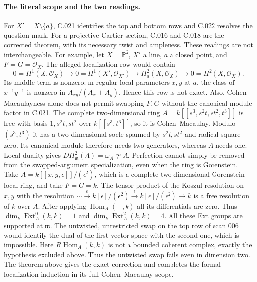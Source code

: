 \paragraph{The literal scope and the two readings.}
For $X'=X\setminus\{a\}$, C.021 identifies the top and bottom
rows and C.022 resolves the question mark. For a projective
Cartier section, C.016 and C.018 are the corrected theorem, with
its necessary twist and ampleness. These readings are not
interchangeable. For example, let $X=\mathbb P^2$, $X'$ a line,
$a$ a closed point, and $F=G=\mathcal O_X$. The alleged
localization row would contain
\[
 0=H^1(X,\mathcal O_X)\longrightarrow
 0=H^1(X',\mathcal O_{X'})\longrightarrow
 H^2_a(X,\mathcal O_X)\longrightarrow
 0=H^2(X,\mathcal O_X).
\]
Its middle term is nonzero: in regular local parameters $x,y$
at $a$, the class of $x^{-1}y^{-1}$ is nonzero in
$A_{xy}/(A_x+A_y)$. Hence this row is not exact. Also,
Cohen--Macaulayness alone does not permit swapping $F,G$ without
the canonical-module factor in C.021. The complete two-dimensional
ring $A=k[[s^3,s^2t,st^2,t^3]]$ is free with basis
$1,s^2t,st^2$ over $k[[s^3,t^3]]$, so it is Cohen--Macaulay.
Modulo $(s^3,t^3)$ it has a two-dimensional socle spanned by
$s^2t,st^2$ and radical square zero. Its canonical module
therefore needs two generators, whereas $A$ needs one.
Local duality gives $D H^2_{\mathfrak m}(A)=\omega_A\not\simeq A$.
Perfection cannot simply be removed from the swapped-argument
specialization, even when the ring is Gorenstein. Take
$A=k[[x,y,\epsilon]]/(\epsilon^2)$, which is a complete
two-dimensional Gorenstein local ring, and take $F=G=k$.
The tensor product of the Koszul resolution on $x,y$ with
the resolution
$\cdots\xrightarrow{\epsilon} k[\epsilon]/(\epsilon^2)
\xrightarrow{\epsilon} k[\epsilon]/(\epsilon^2)\to k$
is a free resolution of $k$ over $A$.
After applying $\operatorname{Hom}_A(-,k)$ all its
differentials are zero. Thus
$\dim_k\operatorname{Ext}^0_A(k,k)=1$ and
$\dim_k\operatorname{Ext}^2_A(k,k)=4$.
All these Ext groups are supported at $\mathfrak m$.
The untwisted, unrestricted swap on the top row of scan 006
would identify the dual of the first vector space with the
second one, which is impossible. Here
$R\operatorname{Hom}_A(k,k)$ is not a bounded coherent
complex, exactly the hypothesis excluded above.
Thus the untwisted swap fails even in dimension two. The theorem
above gives the exact correction and completes the formal
localization induction in its full Cohen--Macaulay scope.


